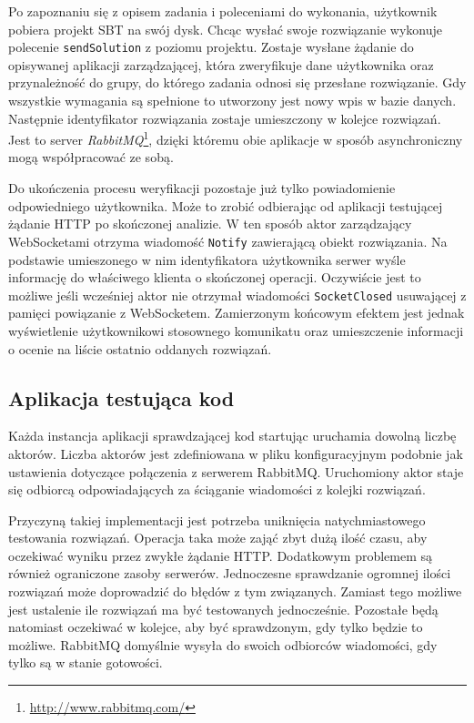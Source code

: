\documentclass[brudnopis]{xmgr}
\begin{document}
Po zapoznaniu się z opisem zadania i poleceniami do wykonania, użytkownik pobiera projekt SBT na swój dysk. Chcąc wysłać swoje rozwiązanie wykonuje polecenie \texttt{sendSolution} z poziomu projektu. Zostaje wysłane żądanie do opisywanej aplikacji zarządzającej, która zweryfikuje dane użytkownika oraz przynależność do grupy, do którego zadania odnosi się przesłane rozwiązanie. Gdy wszystkie wymagania są spełnione to utworzony jest nowy wpis w bazie danych. Następnie identyfikator rozwiązania zostaje umieszczony w kolejce rozwiązań. Jest to server \emph{RabbitMQ}\footnote{\url{http://www.rabbitmq.com/}}, dzięki któremu obie aplikacje w sposób asynchroniczny mogą współpracować ze sobą.
  
Do ukończenia procesu weryfikacji pozostaje już tylko powiadomienie odpowiedniego użytkownika. Może to zrobić odbierając od aplikacji testującej żądanie HTTP po skończonej analizie. W ten sposób aktor zarządzający WebSocketami otrzyma wiadomość \texttt{Notify} zawierającą obiekt rozwiązania. Na podstawie umieszonego w nim identyfikatora użytkownika serwer wyśle informację do właściwego klienta o skończonej operacji. Oczywiście jest to możliwe jeśli wcześniej aktor nie otrzymał wiadomości \texttt{SocketClosed} usuwającej z pamięci powiązanie z WebSocketem. Zamierzonym końcowym efektem jest jednak wyświetlenie użytkownikowi stosownego komunikatu oraz umieszczenie informacji o ocenie na liście ostatnio oddanych rozwiązań. 

\subsection{Aplikacja testująca kod}
 
Każda instancja aplikacji sprawdzającej kod startując uruchamia dowolną liczbę aktorów. Liczba aktorów jest zdefiniowana w pliku konfiguracyjnym podobnie jak ustawienia dotyczące połączenia z serwerem RabbitMQ. Uruchomiony aktor staje się odbiorcą odpowiadających za ściąganie wiadomości z kolejki rozwiązań. 

Przyczyną takiej implementacji jest potrzeba uniknięcia natychmiastowego testowania rozwiązań. Operacja taka może zająć zbyt dużą ilość czasu, aby oczekiwać wyniku przez zwykłe żądanie HTTP. Dodatkowym problemem są również ograniczone zasoby serwerów. Jednoczesne sprawdzanie ogromnej ilości rozwiązań może doprowadzić do błędów z tym związanych. Zamiast tego możliwe jest ustalenie ile rozwiązań ma być testowanych jednocześnie. Pozostałe będą natomiast oczekiwać w kolejce, aby być sprawdzonym, gdy tylko będzie to możliwe. RabbitMQ domyślnie wysyła do swoich odbiorców wiadomości, gdy tylko są w stanie gotowości.
\end{document}

